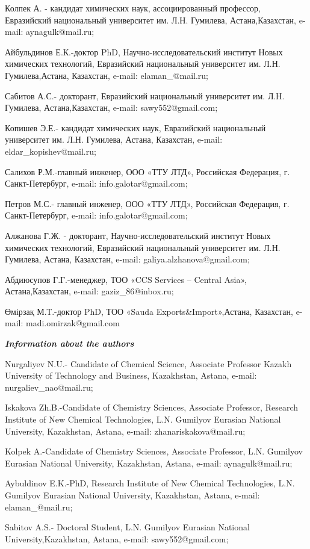 Колпек А. - кандидат химических наук, ассоциированный профессор,
Евразийский национальный университет им. Л.Н. Гумилева,
Астана,Казахстан, e-mail: aynagulk@mail.ru;

Айбульдинов Е.К.-доктор PhD, Научно-исследовательский институт Новых
химических технологий, Евразийский национальный университет им. Л.Н.
Гумилева,Астана, Казахстан, e-mail: elaman\_@mail.ru;

Сабитов А.С.- докторант, Евразийский национальный университет им. Л.Н.
Гумилева, Астана,Казахстан, e-mail: sawy552@gmail.com;

Копишев Э.Е.- кандидат химических наук, Евразийский национальный
университет им. Л.Н. Гумилева, Астана, Казахстан, e-mail:
eldar\_kopishev@mail.ru;

Салихов Р.М.-главный инженер, ООО «ТТУ ЛТД», Российская Федерация, г.
Санкт-Петербург, e-mail: info.galotar@gmail.com;

Петров М.С.- главный инженер, ООО «ТТУ ЛТД», Российская Федерация, г.
Санкт-Петербург, e-mail: info.galotar@gmail.com;

Алжанова Г.Ж. - докторант, Научно-исследовательский институт Новых
химических технологий, Евразийский национальный университет им. Л.Н.
Гумилева, Астана, Казахстан, e-mail: galiya.alzhanova@gmail.com;

Абдиюсупов Г.Г.-менеджер, ТОО «CCS Services -- Central Asia»,
Астана,Казахстан, e-mail: gaziz\_86@inbox.ru;

Өмірзақ М.Т.-доктор PhD, ТОО «Sauda Exports\&Import»,Астана, Казахстан,
e-mail: madi.omirzak@gmail.com

\emph{{\bfseries Information about the authors}}

Nurgaliyev N.U.- Candidate of Chemical Science, Associate Professor
Kazakh University of Technology and Business, Kazakhstan, Astana,
e-mail: nurgaliev\_nao@mail.ru;

Iskakova Zh.B.-Candidate of Chemistry Sciences, Associate Professor,
Research Institute of New Chemical Technologies, L.N. Gumilyov Eurasian
National University, Kazakhstan, Astana, e-mail: zhanariskakova@mail.ru;

Kolpek A.-Candidate of Chemistry Sciences, Associate Professor, L.N.
Gumilyov Eurasian National University, Kazakhstan, Astana, e-mail:
aynagulk@mail.ru;

Aybuldinov E.K.-PhD, Research Institute of New Chemical Technologies,
L.N. Gumilyov Eurasian National University, Kazakhstan, Astana, e-mail:
elaman\_@mail.ru;

Sabitov A.S.- Doctoral Student, L.N. Gumilyov Eurasian National
University,Kazakhstan, Astana, e-mail: sawy552@gmail.com;

